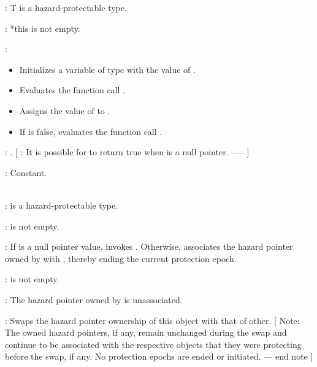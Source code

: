 
\pnum
{}: T is a hazard-protectable type.

\pnum
{}: *this is not empty.

\pnum
{}:
\begin{itemize}
\item Initializes a variable  of type  with the value of .
\item Evaluates the function call .
\item Assigns the value of  to .
\item If  is false, evaluates the function call .
\end{itemize}

\pnum
{}: . [ : It is possible for  to return true when  is a null pointer. --—  ]

\pnum
{}: Constant.
\\

\\
\hspace*{1.1em}


\pnum
{}:  is a hazard-protectable type.

\pnum
{}:  is not empty.

\pnum
{}: If  is a null pointer value, invokes . Otherwise, associates the hazard pointer owned by  with , thereby ending the current protection epoch.
\\


\pnum
{}:  is not empty.

\pnum
{}: The hazard pointer owned by  is unassociated.
\\


\pnum
{}: Swaps the hazard pointer ownership of this object with that of other. [ Note: The owned hazard pointers, if any, remain unchanged during the swap and continue to be associated with the respective objects that they were protecting before the swap, if any. No protection epochs are ended or initiated. — end note ]

